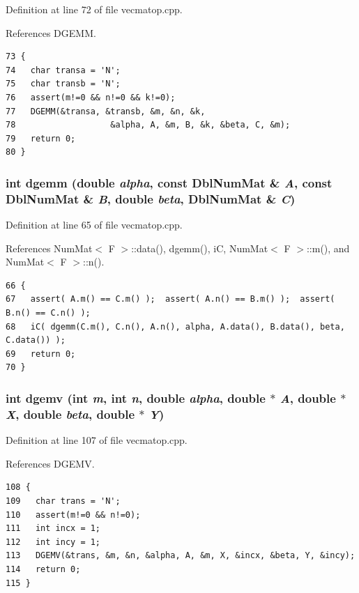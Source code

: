Definition at line 72 of file vecmatop.cpp.

References DGEMM.

\footnotesize\begin{verbatim}73 {
74   char transa = 'N';
75   char transb = 'N';
76   assert(m!=0 && n!=0 && k!=0);
77   DGEMM(&transa, &transb, &m, &n, &k,
78                   &alpha, A, &m, B, &k, &beta, C, &m);
79   return 0;
80 }
\end{verbatim}\normalsize 


\subsubsection{\setlength{\rightskip}{0pt plus 5cm}int dgemm (double {\em alpha}, const {\bf Dbl\-Num\-Mat} \& {\em A}, const {\bf Dbl\-Num\-Mat} \& {\em B}, double {\em beta}, {\bf Dbl\-Num\-Mat} \& {\em C})}\label{vecmatop_8hpp_7893f4c4a19f9a71147f10666feaa39e_7893f4c4a19f9a71147f10666feaa39e}




Definition at line 65 of file vecmatop.cpp.

References Num\-Mat$<$ F $>$::data(), dgemm(), i\-C, Num\-Mat$<$ F $>$::m(), and Num\-Mat$<$ F $>$::n().

\footnotesize\begin{verbatim}66 {
67   assert( A.m() == C.m() );  assert( A.n() == B.m() );  assert( B.n() == C.n() );
68   iC( dgemm(C.m(), C.n(), A.n(), alpha, A.data(), B.data(), beta, C.data()) );
69   return 0;
70 }
\end{verbatim}\normalsize 


\subsubsection{\setlength{\rightskip}{0pt plus 5cm}int dgemv (int {\em m}, int {\em n}, double {\em alpha}, double $\ast$ {\em A}, double $\ast$ {\em X}, double {\em beta}, double $\ast$ {\em Y})}\label{vecmatop_8hpp_f86104cd2d030678903b8a17738ff742_f86104cd2d030678903b8a17738ff742}




Definition at line 107 of file vecmatop.cpp.

References DGEMV.

\footnotesize\begin{verbatim}108 {
109   char trans = 'N';
110   assert(m!=0 && n!=0);
111   int incx = 1;
112   int incy = 1;
113   DGEMV(&trans, &m, &n, &alpha, A, &m, X, &incx, &beta, Y, &incy);
114   return 0;
115 }
\end{verbatim}\normalsize 



